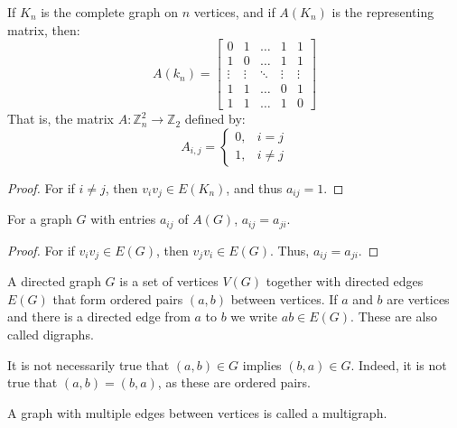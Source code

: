     \begin{theorem}
        If $K_{n}$ is the complete graph on $n$ vertices, and if $A(K_n)$ is
        the representing matrix, then:
        \begin{equation}
            A(k_{n})=
            \begin{bmatrix}
                0&1&\hdots&1&1\\
                1&0&\hdots&1&1\\
                \vdots&\vdots&\ddots&\vdots&\vdots\\
                1&1&\dots&0&1\\
                1&1&\hdots&1&0
            \end{bmatrix}
        \end{equation}
        That is, the matrix $A:\mathbb{Z}_{n}^{2}\rightarrow\mathbb{Z}_{2}$
        defined by:
        \begin{equation}
            A_{i,j}=
            \begin{cases}
                0,&i=j\\
                1,&i\ne{j}
            \end{cases}
        \end{equation}
    \end{theorem}
    \begin{proof}
    For if $i\ne j$, then $v_iv_j \in E(K_n)$, and thus $a_{ij}=1$.
    \end{proof}
    \begin{theorem}
    For a graph $G$ with entries $a_{ij}$ of $A(G)$, $a_{ij} = a_{ji}$.
    \end{theorem}
    \begin{proof}
    For if $v_iv_j \in E(G)$, then $v_j v_i \in E(G)$. Thus, $a_{ij} = a_{ji}$.
    \end{proof}
    \begin{definition}
    A directed graph $G$ is a set of vertices $V(G)$ together with directed edges $E(G)$ that form ordered pairs $(a,b)$ between vertices. If $a$ and $b$ are vertices and there is a directed edge from $a$ to $b$ we write $ab \in E(G)$. These are also called digraphs.
    \end{definition}
    It is not necessarily true that $(a,b) \in G$ implies $(b,a) \in G$.
    Indeed, it is not true that $(a,b) = (b,a)$, as these are ordered pairs.
    \begin{definition}
    A graph with multiple edges between vertices is called a multigraph.
    \end{definition}
